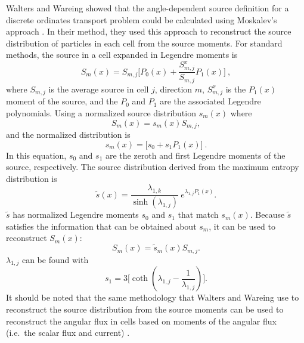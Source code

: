 Walters and Wareing \cite{walters_nonlinear_1994, walters_accurate_1996} showed
that the angle-dependent source definition for a discrete ordinates transport problem
could be calculated using Moskalev's approach
\cite{moskalev_reconstruction_1993}. In their method, they used this approach to
reconstruct the source distribution of particles in each cell from the source
moments. For standard methods, the source in a cell expanded in Legendre moments is
\begin{equation}
  S_m(x) = S_{m,j}\bigg[ P_0(x) + \frac{S_{m,j}^x}{S_{m,j}}P_1(x)\bigg]\:,
\end{equation}
where $S_{m,j}$ is the average source in cell $j$, direction $m$, $S_{m,j}^x$ is the
$P_1(x)$ moment of the source, and the $P_0$ and $P_1$ are the associated
Legendre polynomials. Using a normalized source distribution $s_m(x)$ where
\begin{equation*}
  S_m(x) = s_m(x) S_{m,j},
\end{equation*}
and the normalized distribution is
\begin{equation}
  s_m(x) = \big[ s_0 + s_1 P_1(x)\big]\:.
\end{equation}
In this equation,
$s_0$ and $s_1$ are the zeroth and first Legendre moments of the source,
respectively.
The source distribution derived from the maximum entropy distribution is
\begin{equation}
  \tilde{s}(x) = \frac{\lambda_{1,k}}{\sinh (\lambda_{1,j})} \
  e^{\lambda_{1,j}P_1(x)} .
\end{equation}
$\tilde{s}$ has normalized Legendre moments $s_0$ and $s_1$ that match
$s_m(x)$. Because $\tilde{s}$ satisfies the information that can be obtained
about $s_m$, it can be used to reconstruct $S_m(x)$:
\begin{equation}
  S_m(x) = \tilde{s}_m(x)S_{m,j}.
\label{eq:Walt_reconstruct}
\end{equation}
$\lambda_{1,j}$ can be found with
\begin{equation}
  s_1 = 3\bigg[ \coth(\lambda_{1,j} - \frac{1}{\lambda_{1,j}})\bigg] .
  \label{eq:WW_lambda}
\end{equation}
It should be noted that the same methodology that Walters and Wareing use to reconstruct the source
distribution from the source moments can be used to reconstruct the angular flux
in cells based on moments of the angular flux (i.e.\ the scalar flux and
current) \cite{walters_nonlinear_1994}.

